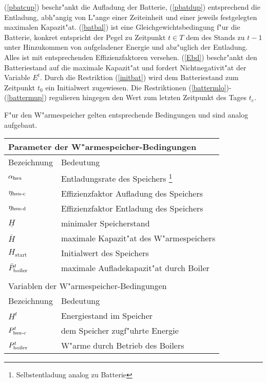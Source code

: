(\ref{pbatcup}) beschr"ankt die Aufladung der Batterie, (\ref{pbatdup}) entsprechend die Entladung, abh"angig von L"ange einer Zeiteinheit und einer jeweils festgelegten maximalen Kapazit"at. (\ref{batbal}) ist eine Gleichgewichtsbedingung f"ur die Batterie, konkret entspricht der Pegel zu Zeitpunkt $t \in T$ dem des Stands zu $t-1$ unter Hinzukommen von aufgeladener Energie und abz"uglich der Entladung. Alles ist mit entsprechenden Effizienzfaktoren versehen. (\ref{Ebd}) beschr"ankt den Batteriestand auf die maximale Kapazit"at und fordert Nichtnegativit"at der Variable $E^t$.
Durch die Restriktion (\ref{initbat}) wird dem Batteriestand zum Zeitpunkt $t_0$ ein Initialwert zugewiesen. Die Restriktionen (\ref{battermlo})-(\ref{battermup}) regulieren hingegen den Wert zum letzten Zeitpunkt des Tages $t_e$.

F"ur den W"armespeicher gelten entsprechende Bedingungen und sind analog aufgebaut.

\begin{tabular}{l l}
\multicolumn{2}{l}{Parameter der W"armespeicher-Bedingungen}\\
\hline
Bezeichnung & Bedeutung \\
\hline
$\alpha_{\text{hsu}}$ & Entladungsrate des Speichers \footnote{Selbstentladung analog zu Batterie}\\
$\eta_{\text{hsu-c}}$ & Effizienzfaktor Aufladung des Speichers  \\
$\eta_{\text{hsu-d}}$ & Effizienzfaktor Entladung des Speichers  \\
$\underline H$ & minimaler Speicherstand \\
$\bar H$ & maximale Kapazit"at des W"armespeichers \\
$H_{\text{start}}$& Initialwert des Speichers \\
$\bar P^t_{\text{boiler}}$ & maximale Aufladekapazit"at durch Boiler \\\\
\multicolumn{2}{l}{Variablen der  W"armespeicher-Bedingungen}\\
\hline
Bezeichnung & Bedeutung \\
\hline
$H^t$ & Energiestand im Speicher \\
$P^t_{\text{hsu-c}}$ & dem Speicher zugf"uhrte Energie \\
$P^t_{\text{boiler}}$ & W"arme durch Betrieb des Boilers \\
\end{tabular}

